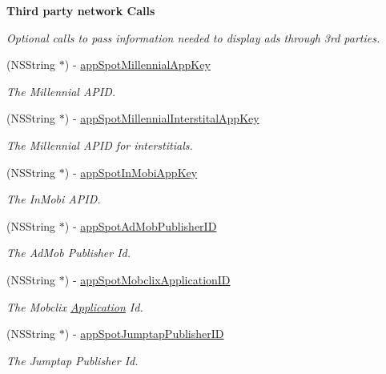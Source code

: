 \begin{Indent}\textbf{ Third party network Calls}\par
{\em Optional calls to pass information needed to display ads through 3rd parties. }\begin{DoxyCompactItemize}
\item 
(N\+S\+String $\ast$) -\/ \hyperlink{protocolFlurryAdDelegate_01-p_a01d0c47af3d321b8d0785fd76d68576d}{app\+Spot\+Millennial\+App\+Key}
\begin{DoxyCompactList}\small\item\em The Millennial A\+P\+ID. \end{DoxyCompactList}\item 
(N\+S\+String $\ast$) -\/ \hyperlink{protocolFlurryAdDelegate_01-p_a366bfa8d8eca645ec976fe0debe94ae9}{app\+Spot\+Millennial\+Interstital\+App\+Key}
\begin{DoxyCompactList}\small\item\em The Millennial A\+P\+ID for interstitials. \end{DoxyCompactList}\item 
(N\+S\+String $\ast$) -\/ \hyperlink{protocolFlurryAdDelegate_01-p_ac24b29663d5da5a036df7c651eb8fa1f}{app\+Spot\+In\+Mobi\+App\+Key}
\begin{DoxyCompactList}\small\item\em The In\+Mobi A\+P\+ID. \end{DoxyCompactList}\item 
(N\+S\+String $\ast$) -\/ \hyperlink{protocolFlurryAdDelegate_01-p_a7d107749c75f41d2590dbf3e8a1e64bf}{app\+Spot\+Ad\+Mob\+Publisher\+ID}
\begin{DoxyCompactList}\small\item\em The Ad\+Mob Publisher Id. \end{DoxyCompactList}\item 
(N\+S\+String $\ast$) -\/ \hyperlink{protocolFlurryAdDelegate_01-p_af91d5c9908f99a56139a9efaa052defc}{app\+Spot\+Mobclix\+Application\+ID}
\begin{DoxyCompactList}\small\item\em The Mobclix \hyperlink{classApplication}{Application} Id. \end{DoxyCompactList}\item 
(N\+S\+String $\ast$) -\/ \hyperlink{protocolFlurryAdDelegate_01-p_aa47f249e8a0aeeb33395e5edd0aaf626}{app\+Spot\+Jumptap\+Publisher\+ID}
\begin{DoxyCompactList}\small\item\em The Jumptap Publisher Id. \end{DoxyCompactList}\item 

\end{DoxyCompactItemize}
\end{Indent}
